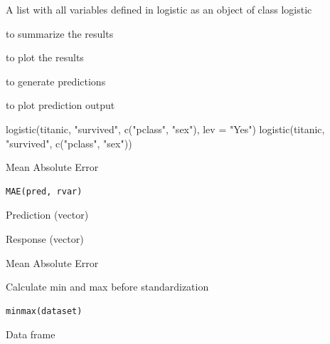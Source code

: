 \documentclass[a4paper]{book}
\begin{document}
%
\begin{Value}
A list with all variables defined in logistic as an object of class logistic
\end{Value}
%
\begin{SeeAlso}
 to summarize the results

 to plot the results

 to generate predictions

 to plot prediction output
\end{SeeAlso}
%
\begin{Examples}
\begin{ExampleCode}
logistic(titanic, "survived", c("pclass", "sex"), lev = "Yes") %
logistic(titanic, "survived", c("pclass", "sex")) %
\end{ExampleCode}
\end{Examples}
%
\begin{Description}
Mean Absolute Error
\end{Description}
%
\begin{Usage}
\begin{verbatim}
MAE(pred, rvar)
\end{verbatim}
\end{Usage}
%
\begin{Arguments}
\begin{ldescription}
\item[\code{pred}] Prediction (vector)

\item[\code{rvar}] Response (vector)
\end{ldescription}
\end{Arguments}
%
\begin{Value}
Mean Absolute Error
\end{Value}
%
\begin{Description}
Calculate min and max before standardization
\end{Description}
%
\begin{Usage}
\begin{verbatim}
minmax(dataset)
\end{verbatim}
\end{Usage}
%
\begin{Arguments}
\begin{ldescription}
\item[\code{dataset}] Data frame
\end{ldescription}
\end{Arguments}
\end{document}
